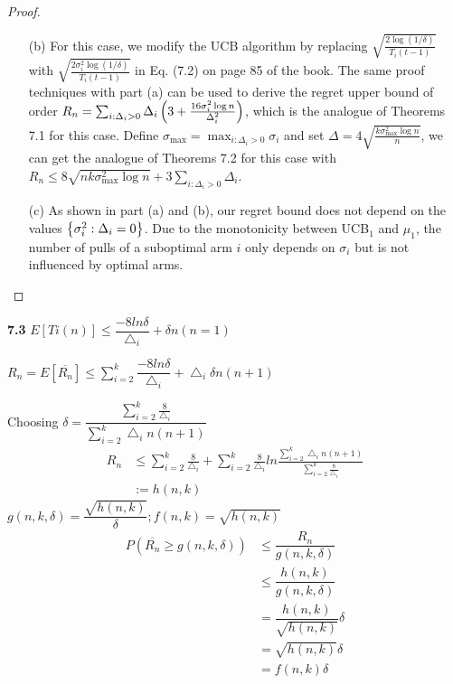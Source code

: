 \begin{enumerate}[(a)]
\begin{proof}
\begin{enumerate}
    \item[(b)] For this case, we modify the UCB algorithm by replacing $\sqrt{\frac{2\log (1/\delta)}{T_i(t-1)}}$ with $\sqrt{\frac{2\sigma_i^2 \log (1/\delta)}{T_i(t-1)}}$ in Eq. (7.2) on page 85 of the book. The same proof techniques with part (a) can be used to derive the regret upper bound of order $R_n = \sum_{i:\Delta_i>0}\Delta_i \left( 3 + \frac{16\sigma_i^2 \log n}{\Delta_i^2}\right)$, which is the analogue of Theorems 7.1 for this case. Define $\sigma_{\max} = \max_{i:\Delta_i>0}\sigma_i$ and set $\Delta = 4\sqrt{\frac{k\sigma_{\max}^2 \log n}{n}}$, we can get the analogue of Theorems 7.2 for this case with $R_n \le 8\sqrt{nk\sigma_{\max}^2 \log n} + 3\sum_{i:\Delta_i >0} \Delta_i$.

    \item[(c)] As shown in part (a) and (b), our regret bound does not depend on the values $\left\{ \sigma_i^2:\Delta_i=0 \right\}$. Due to the monotonicity between UCB$_1$ and $\mu_1$, the number of pulls of a suboptimal arm $i$ only depends on $\sigma_i$ but is not influenced by optimal arms. 
\end{enumerate}
\end{proof}

\noindent\textbf{7.3}
    $E[Ti(n)]\le\dfrac{-8ln\delta}{\bigtriangleup_i}+\delta n(n=1)$


    $R_n=E[\overline{R_n}]\le\sum^{k}_{i=2}\dfrac{-8ln\delta}{\bigtriangleup_i}+\bigtriangleup_i\delta n(n+1)$


    Choosing
    $\delta=\dfrac{\sum^{k}_{i=2}\frac{8}{\bigtriangleup_i}}{\sum^{k}_{i=2}\bigtriangleup_i   n(n+1)}$
    \begin{align*}
    R_n &\le\sum^{k}_{i=2}\frac{8}{\bigtriangleup_i}+\sum^{k}_{i=2}\frac{8}{\bigtriangleup_i}ln\frac{\sum^{k}_{i=2}\bigtriangleup_i n(n+1)}{\sum^{k}_{i=2}\frac{8}{\bigtriangleup_i}}\\
    &:=h(n,k)
    \end{align*}
    $g(n,k,\delta)=\dfrac{\sqrt{h(n,k)}}{\delta};f(n,k)=\sqrt{h(n,k)}$
    \begin{align*}
    P(\overline{R_n}\ge g(n,k,\delta)) &\le\dfrac{R_n}{g(n,k,\delta)}\\
    &\le\dfrac{h(n,k)}{g(n,k,\delta)}\\
    &=\dfrac{h(n,k)}{\sqrt{h(n,k)}}\delta\\
    &=\sqrt{h(n,k)}\delta\\
    &=f(n,k)\delta
    \end{align*}


\end{enumerate}
